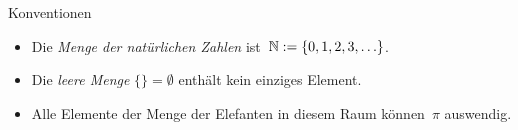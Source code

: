 \documentclass{../zirkelblatt}
\begin{document}

\begin{block}{Konventionen}
\begin{itemize}
\item[]
Die \emph{Menge der natürlichen Zahlen} ist~$\mathbb{N} := \{ 0, 1, 2, 3, \ldots \}$.
\item[]
Die \emph{leere Menge} $\{ \} = \emptyset$ enthält kein einziges Element.
\item[]
Alle Elemente der Menge der Elefanten in diesem Raum können~$\pi$ auswendig.
\end{itemize}
\end{block}
\end{document}
